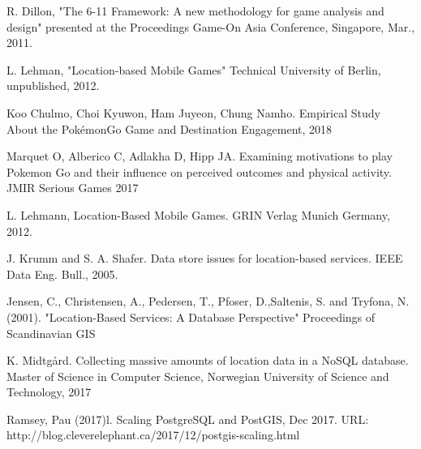 \documentclass[conference]{IEEEtran}
\begin{document}
\begin{thebibliography}{1}

R. Dillon, "The 6-11 Framework: A new methodology for game analysis and design" presented at the Proceedings Game-On Asia Conference, Singapore, Mar., 2011.

L. Lehman, "Location-based Mobile Games" Technical University of Berlin, unpublished, 2012.
  
Koo Chulmo, Choi Kyuwon, Ham Juyeon, Chung Namho. Empirical Study About the PokémonGo Game and Destination Engagement, 2018

Marquet O, Alberico C, Adlakha D, Hipp JA. Examining motivations to play Pokemon Go and their influence on perceived
outcomes and physical activity. JMIR Serious Games 2017

L. Lehmann, Location-Based Mobile Games. GRIN Verlag Munich Germany, 2012.

J. Krumm and S. A. Shafer. Data store issues for location-based services. IEEE Data Eng. Bull., 2005.

Jensen, C., Christensen, A., Pedersen, T., Pfoser, D.,Saltenis, S. and Tryfona, N. (2001). "Location-Based Services: A Database Perspective" Proceedings of Scandinavian GIS

K. Midtgård. Collecting massive amounts of location data in a NoSQL database. Master of Science in Computer Science, Norwegian University of Science and Technology, 2017

Ramsey, Pau (2017)l. Scaling PostgreSQL and PostGIS, Dec 2017. URL: http://blog.cleverelephant.ca/2017/12/postgis-scaling.html

\end{thebibliography}
\end{document}
